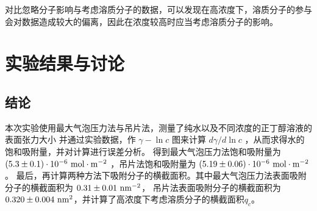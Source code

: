 \documentclass[cn,hazy,pku,12pt,normal,math=newtx,cite=super]{elegantnote}
\begin{document}
对比忽略分子影响与考虑溶质分子的数据，可以发现在高浓度下，溶质分子的参与会对数据造成较大的偏离，因此在浓度较高时应当考虑溶质分子的影响。



\section{实验结果与讨论}

\subsection{结论}

本次实验使用最大气泡压力法与吊片法，测量了纯水以及不同浓度的正丁醇溶液的表面张力大小
并通过实验数据，作 $\gamma-\ln c$ 图来计算 $d \gamma / d \ln c$ ，从而求得水的饱和吸附量，并对计算进行误差分析。
得到最大气泡压力法饱和吸附量为 $(5.3 \pm 0.1) \cdot 10^{-6} {\rm\ mol \cdot m^{-2}}$
，吊片法饱和吸附量为 $(5.19 \pm 0.06) \cdot 10^{-6} {\rm\ mol \cdot m^{-2}}$。
最后，再计算两种方法下吸附分子的横截面积。其中最大气泡压力法表面吸附分子的横截面积为 $0.31 \pm 0.01 {\rm\ nm^{-2}}$，
吊片法表面吸附分子的横截面积为 $0.320 \pm 0.004 {\rm\ nm^{2}}$，并计算了高浓度下考虑溶质分子的横截面积$q_c$。

\nocite{*}

\end{document}
